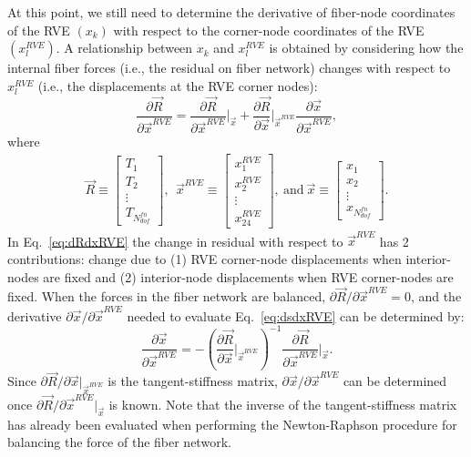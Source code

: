 At this point, we still need to determine the derivative of fiber-node coordinates of the RVE $(x_k)$ with respect to the corner-node coordinates of the RVE $(x_l^{RVE})$. A relationship between $x_k$ and $x_l^{RVE}$ is obtained by considering how the internal fiber forces (i.e., the residual on fiber network) changes with respect to $x_l^{RVE}$ (i.e., the displacements at the RVE corner nodes):
%
\begin{equation}
\frac{\partial \vec{R}}{\partial \vec{x}^{RVE}} = \frac{\partial \vec{R}}{\partial \vec{x}^{RVE}} \bigg |_{\vec{x}} + \frac{\partial \vec{R}}{\partial \vec{x}} \bigg |_{\vec{x}^{RVE}} \frac{\partial \vec{x}}{\partial \vec{x}^{RVE}},
\label{eq:dRdxRVE}
\end{equation}
%
where
%
\begin{eqnarray}
\vec{R} \equiv \begin{bmatrix}
T_1 \\
T_2 \\
\vdots \\
T_{N_{dof}^{fn}}
\end{bmatrix}, \ \ 
%
\vec{x}^{RVE} \equiv \begin{bmatrix}
x_1^{RVE} \\
x_2^{RVE} \\
\vdots \\
x_{24}^{RVE}
\end{bmatrix}, \ \text{and} \
%
\vec{x} \equiv \begin{bmatrix}
x_1 \\
x_2 \\
\vdots \\
x_{N_{dof}^{fn}} 
\end{bmatrix} .
\end{eqnarray}
%
In Eq.\ \eqref{eq:dRdxRVE} the change in residual with respect to $\vec{x}^{RVE}$ has 2 contributions: change due to (1) RVE corner-node displacements when interior-nodes are fixed and (2) interior-node displacements when RVE corner-nodes  are fixed. When the forces in the fiber network are balanced, $\partial \vec{R}/\partial \vec{x}^{RVE} = 0$, and the derivative $\partial \vec{x}/\partial \vec{x}^{RVE}$ needed to evaluate Eq.\ \eqref{eq:dsdxRVE} can be determined by:
%
\begin{equation}
\frac{\partial \vec{x}}{\partial \vec{x}^{RVE}} = -\left(\frac{\partial \vec{R}}{\partial \vec{x}} \bigg |_{\vec{x}^{RVE}}\right)^{-1}\frac{\partial \vec{R}}{\partial \vec{x}^{RVE}}\bigg |_{\vec{x}} .
\end{equation}
%
Since $\partial \vec{R}/\partial \vec{x} |_{\vec{x}^{RVE}}$ is the tangent-stiffness matrix, $\partial \vec{x}/\partial \vec{x}^{RVE}$ can be determined once $\partial \vec{R}/\partial \vec{x}^{RVE} |_{\vec{x}}$ is known. Note that the inverse of the tangent-stiffness matrix has already been evaluated when performing the Newton-Raphson procedure for balancing the force of the fiber network.

